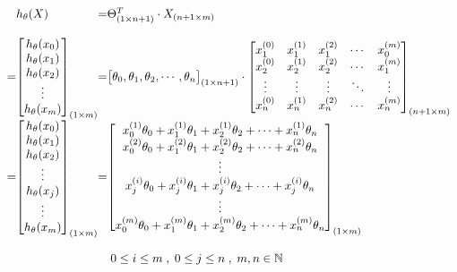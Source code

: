 \[
	\begin{array}{ l@{} l@{} l@{} l@{}} 
	& h_\theta (X)
	& = & \Theta_{(1 \times n+1)}^{T} \cdot X_{(n+1 \times m)} \\ 
	\\ 
	= &
	\begin{bmatrix} 
		h_\theta(x_{0}) \\
		h_\theta(x_{1}) \\
		h_\theta(x_{2}) \\
		\vdots \\
		h_\theta(x_{m}) \\ 
	\end{bmatrix}_{(1 \times m)} 
	& = & 
	\begin{bmatrix} 
		\theta_0 ,
		\theta_1 ,
		\theta_2 ,
		\cdots ,
		\theta_n 
	\end{bmatrix}_{(1 \times n+1)} 
	\cdot 
	\begin{bmatrix} 
		x_{1}^{(0)} & x_{1}^{(1)} & x_{1}^{(2)} & \cdots & x_{0}^{(m)} \\
		x_{2}^{(0)} & x_{2}^{(1)} & x_{2}^{(2)} &\cdots & x_{1}^{(m)} \\ 
		\vdots & \vdots & \vdots & \ddots & \vdots \\ 
		x_{n}^{(0)} & x_{n}^{(1)} & x_{n}^{(2)} &\cdots & x_{n}^{(m)} \\ 
	\end{bmatrix}_{(n+1 \times m)} \\ 
	= &
	\begin{bmatrix} 
		h_\theta(x_{0}) \\
		h_\theta(x_{1}) \\
		h_\theta(x_{2}) \\ 
		\vdots \\ 
		h_\theta(x_{j}) \\ 
		\vdots \\ 
		h_\theta(x_{m}) \\ 
	\end{bmatrix}_{(1 \times m)} 
	& = &
	\begin{bmatrix} 
		x_{0}^{(1)} \theta_0 +
		x_{1}^{(1)} \theta_1 +
		x_{2}^{(1)} \theta_2 +
		\cdots +
		x_{n}^{(1)} \theta_n \\ 
		x_{0}^{(2)} \theta_0 +
		x_{1}^{(2)} \theta_1 +
		x_{2}^{(2)} \theta_2 +
		\cdots +
		x_{n}^{(2)} \theta_n \\ 
		\vdots \\ 
		x_{j}^{(i)} \theta_0 +
		x_{j}^{(i)} \theta_1 +
		x_{j}^{(i)} \theta_2 +
		\cdots +
		x_{j}^{(i)} \theta_n \\ 
		\vdots \\ 
		x_{0}^{(m)} \theta_0 +
		x_{1}^{(m)} \theta_1 +
		x_{2}^{(m)} \theta_2 +
		\cdots +
		x_{n}^{(m)} \theta_n \\ 
	\end{bmatrix}_{(1 \times m)} 
	\\
	\\
	& & &
	\; 0 \leq i \leq m \; ,
	\; 0 \leq j \leq n \; ,
	\; m , n \in \mathbb{N} 
	\end{array}
	\] 

